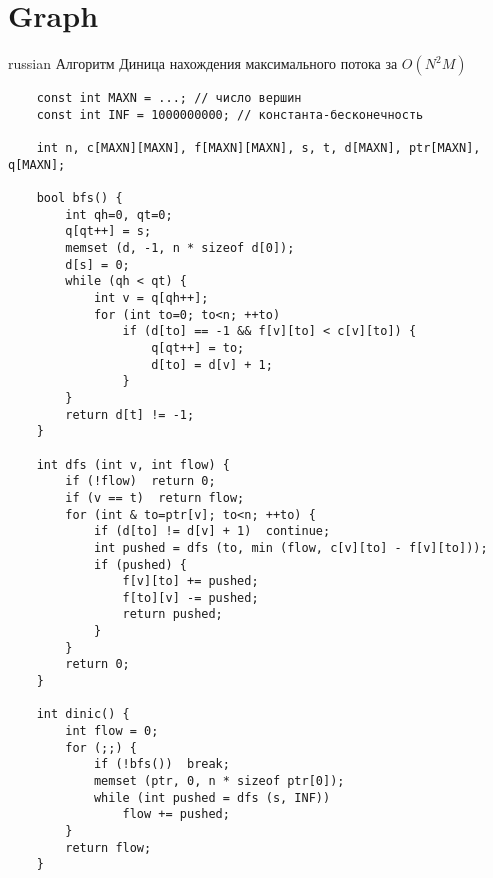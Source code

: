 \documentclass{article}
\begin{document}
\section{Graph}
\begin{otherlanguage*}{russian}
    Алгоритм Диница нахождения максимального потока за  $O (N^2 M)$
\end{otherlanguage*}
\begin{verbatim}
    const int MAXN = ...; // число вершин
    const int INF = 1000000000; // константа-бесконечность
     
    int n, c[MAXN][MAXN], f[MAXN][MAXN], s, t, d[MAXN], ptr[MAXN], q[MAXN];
     
    bool bfs() {
        int qh=0, qt=0;
        q[qt++] = s;
        memset (d, -1, n * sizeof d[0]);
        d[s] = 0;
        while (qh < qt) {
            int v = q[qh++];
            for (int to=0; to<n; ++to)
                if (d[to] == -1 && f[v][to] < c[v][to]) {
                    q[qt++] = to;
                    d[to] = d[v] + 1;
                }
        }
        return d[t] != -1;
    }
     
    int dfs (int v, int flow) {
        if (!flow)  return 0;
        if (v == t)  return flow;
        for (int & to=ptr[v]; to<n; ++to) {
            if (d[to] != d[v] + 1)  continue;
            int pushed = dfs (to, min (flow, c[v][to] - f[v][to]));
            if (pushed) {
                f[v][to] += pushed;
                f[to][v] -= pushed;
                return pushed;
            }
        }
        return 0;
    }
     
    int dinic() {
        int flow = 0;
        for (;;) {
            if (!bfs())  break;
            memset (ptr, 0, n * sizeof ptr[0]);
            while (int pushed = dfs (s, INF))
                flow += pushed;
        }
        return flow;
    }
\end{verbatim}
\end{document}
